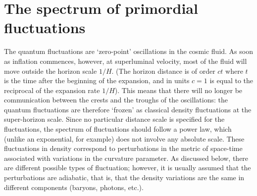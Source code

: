 \documentclass[12pt,a4paper]{article}
\begin{document}
\section{The spectrum of primordial fluctuations}
\cite{perkins2008particle} The quantum fluctuations are `zero-point' oscillations in the cosmic fluid. As soon as inflation commences, however, at superluminal velocity, most of the fluid will move outside the horizon scale $1/H$. (The horizon distance is of order $ct$ where $t$ is the time after the beginning of the expansion, and in units $c = 1$ is equal to the reciprocal of the expansion rate $1/H$). This means that there will no longer be communication between the crests and the troughs of the oscillations: the quantum fluctuations are therefore `frozen' as classical density fluctuations at the super-horizon scale. Since no particular distance scale is specified for the fluctuations, the spectrum of fluctuations should follow a power law, which (unlike an exponential, for example) does not involve any absolute scale. These fluctuations in density correspond to perturbations in the metric of space-time associated with variations in the curvature parameter. As discussed below, there are different possible types of fluctuation; however, it is usually assumed that the perturbations are adiabatic, that is, that the density variations are the same in different components (baryons, photons, etc.).













\end{document}
